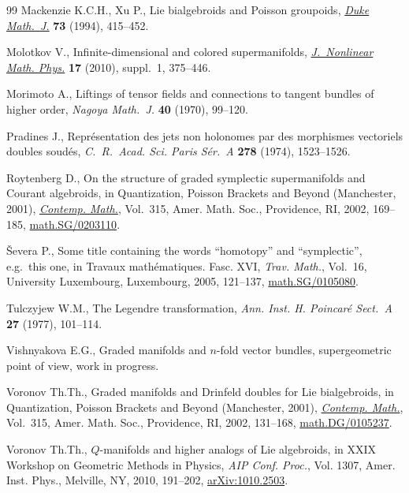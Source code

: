\documentclass[10pt,a4paper]{amsart}
\numberwithin{equation}{section}
\begin{document}
\begin{thebibliography}{99}
Mackenzie K.C.H., Xu P., Lie bialgebroids and {P}oisson groupoids, \href{http://dx.doi.org/10.1215/S0012-7094-94-07318-3}{\textit{Duke
  Math.~J.}} \textbf{73} (1994), 415--452.

Molotkov V., Inf\/inite-dimensional and colored supermanifolds,
  \href{http://dx.doi.org/10.1142/S140292511000088X}{\textit{J.~Nonlinear Math. Phys.}} \textbf{17} (2010), suppl.~1, 375--446.

Morimoto A., Liftings of tensor f\/ields and connections to tangent bundles of
  higher order, \textit{Nagoya Math.~J.} \textbf{40} (1970), 99--120.

Pradines J., Repr\'esentation des jets non holonomes par des morphismes
  vectoriels doubles soud\'es, \textit{C.~R.~Acad. Sci. Paris S\'er.~A}
  \textbf{278} (1974), 1523--1526.

Roytenberg D., On the structure of graded symplectic supermanifolds and
  {C}ourant algebroids, in Quantization, {P}oisson Brackets and Beyond
  ({M}anchester, 2001), \href{http://dx.doi.org/10.1090/conm/315/05479}{\textit{Contemp. Math.}}, Vol.~315, Amer. Math. Soc.,
  Providence, RI, 2002, 169--185, \href{http://arxiv.org/abs/math.SG/0203110}{math.SG/0203110}.

{\v{S}}evera P., Some title containing the words ``homotopy'' and
  ``symplectic'', e.g.\ this one, in Travaux math\'ematiques. {F}asc. {XVI},
  \textit{Trav. Math.}, Vol.~16, University Luxembourg, Luxembourg, 2005,
  121--137, \href{http://arxiv.org/abs/math.SG/0105080}{math.SG/0105080}.

Tulczyjew W.M., The {L}egendre transformation, \textit{Ann. Inst. H. Poincar\'e
  Sect.~A} \textbf{27} (1977), 101--114.

Vishnyakova E.G., Graded manifolds and $n$-fold vector bundles, supergeometric
  point of view, work in progress.

Voronov Th.Th., Graded manifolds and {D}rinfeld doubles for {L}ie bialgebroids,
  in Quantization, {P}oisson Brackets and Beyond ({M}anchester, 2001),
  \href{http://dx.doi.org/10.1090/conm/315/05478}{\textit{Contemp. Math.}}, Vol.~315, Amer. Math. Soc., Providence, RI, 2002,
  131--168, \href{http://arxiv.org/abs/math.DG/0105237}{math.DG/0105237}.

Voronov Th.Th., {$Q$}-manifolds and higher analogs of {L}ie algebroids, in X{XIX}
  {W}orkshop on {G}eometric {M}e\-thods in {P}hysics, \textit{AIP Conf. Proc.},
  Vol. 1307, Amer. Inst. Phys., Melville, NY, 2010, 191--202,
  \href{http://arxiv.org/abs/1010.2503}{arXiv:1010.2503}.


\end{thebibliography}
\end{document}
